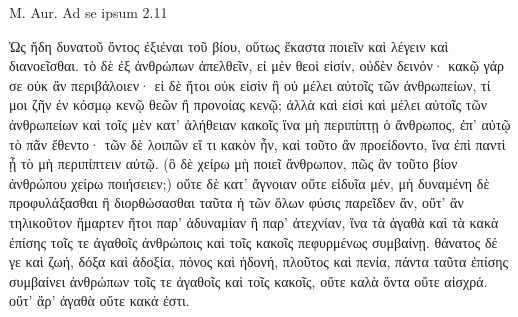 M. Aur. Ad se ipsum 2.11


\medskip


{\large
{ 
\begin{greek}

\noindent  Ὡς ἤδη δυνατοῦ ὄντος ἐξιέναι τοῦ βίου, οὕτως ἕκαστα ποιεῖν καὶ λέγειν καὶ διανοεῖσθαι. τὸ δὲ ἐξ ἀνθρώπων ἀπελθεῖν, εἰ μὲν θεοὶ εἰσίν, οὐδὲν δεινόν· κακῷ γάρ σε οὐκ ἂν περιβάλοιεν· εἰ δὲ ἤτοι οὐκ εἰσὶν ἢ οὐ μέλει αὐτοῖς τῶν ἀνθρωπείων, τί μοι ζῆν ἐν κόσμῳ κενῷ θεῶν ἢ προνοίας κενῷ; ἀλλὰ καὶ εἰσὶ καὶ μέλει αὐτοῖς τῶν ἀνθρωπείων καὶ τοῖς μὲν κατ' ἀλήθειαν κακοῖς ἵνα μὴ περιπίπτῃ ὁ ἄνθρωπος, ἐπ' αὐτῷ τὸ πᾶν ἔθεντο· τῶν δὲ λοιπῶν εἴ τι κακὸν ἦν, καὶ τοῦτο ἂν προείδοντο, ἵνα ἐπὶ παντὶ ᾖ τὸ μὴ περιπίπτειν αὐτῷ. (ὃ δὲ χείρω μὴ ποιεῖ ἄνθρωπον, πῶς ἂν τοῦτο βίον ἀνθρώπου χείρω ποιήσειεν;) οὔτε δὲ κατ' ἄγνοιαν οὔτε εἰδυῖα μέν, μὴ δυναμένη δὲ προφυλάξασθαι ἢ διορθώσασθαι ταῦτα ἡ τῶν ὅλων φύσις παρεῖδεν ἄν, οὔτ' ἂν τηλικοῦτον ἥμαρτεν ἤτοι παρ' ἀδυναμίαν ἢ παρ' ἀτεχνίαν, ἵνα τὰ ἀγαθὰ καὶ τὰ κακὰ ἐπίσης τοῖς τε ἀγαθοῖς ἀνθρώποις καὶ τοῖς κακοῖς πεφυρμένως συμβαίνῃ. θάνατος δέ γε καὶ ζωή, δόξα καὶ ἀδοξία, πόνος καὶ ἡδονή, πλοῦτος καὶ πενία, πάντα ταῦτα ἐπίσης συμβαίνει ἀνθρώπων τοῖς τε ἀγαθοῖς καὶ τοῖς κακοῖς, οὔτε καλὰ ὄντα οὔτε αἰσχρά. οὔτ' ἄρ' ἀγαθὰ οὔτε κακά ἐστι.


\end{greek}


}
}


